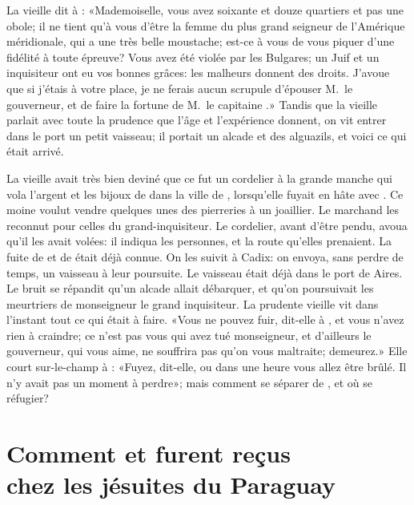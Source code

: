 La vieille dit à : «Mademoiselle, vous avez soixante et douze
quartiers et pas une obole; il ne tient qu’à vous d’être la femme du
plus grand seigneur de l’Amérique méridionale, qui a une très belle
moustache; est-ce à vous de vous piquer d’une fidélité à toute épreuve?
Vous avez été violée par les Bulgares; un Juif et un inquisiteur ont eu
vos bonnes grâces: les malheurs donnent des droits. J’avoue que si
j’étais à votre place, je ne ferais aucun scrupule d’épouser M.~le gouverneur, et de faire la fortune de M.~le capitaine .»
Tandis que la vieille parlait avec toute la prudence que l’âge et
l’expérience donnent, on vit entrer dans le port un petit vaisseau; il
portait un alcade et des alguazils, et voici ce qui était arrivé.

La vieille avait très bien deviné que ce fut un cordelier à la grande
manche qui vola l’argent et les bijoux de  dans la ville de
, lorsqu’elle fuyait en hâte avec . Ce moine voulut
vendre quelques unes des 
pierreries
à un joaillier. Le marchand les
reconnut pour celles du grand-inquisiteur. Le cordelier, avant d’être
pendu, avoua qu’il les avait volées: il indiqua les personnes, et la
route qu’elles prenaient. La fuite de  et de  était
déjà connue. On les suivit à Cadix: on envoya, sans perdre de temps, un
vaisseau à leur poursuite. Le vaisseau était déjà dans le port de
 Aires. Le bruit se répandit qu’un alcade allait débarquer, et
qu’on poursuivait les meurtriers de monseigneur le grand inquisiteur.
La prudente vieille vit dans l’instant tout ce qui était à faire. «Vous
ne pouvez fuir, dit-elle à , et vous n’avez rien à craindre;
ce n’est pas vous qui avez tué monseigneur, et d’ailleurs le
gouverneur, qui vous aime, ne souffrira pas qu’on vous maltraite;
demeurez.» Elle court sur-le-champ à : «Fuyez, dit-elle, ou dans
une heure vous allez être brûlé. Il n’y avait pas un moment à perdre»;
mais comment se séparer de , et où se réfugier?




\chapter[Comment Candide et \bname{Cacambo} furent reçus…]{Comment  et  furent reçus\\chez les jésuites du Paraguay}


